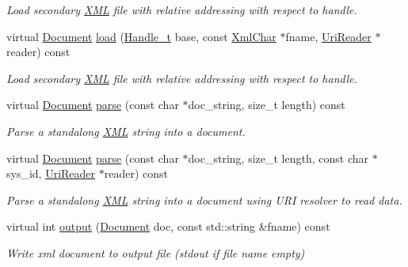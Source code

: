 \begin{DoxyCompactItemize}
\begin{DoxyCompactList}\small\item\em Load secondary \hyperlink{namespace_d_d4hep_1_1_x_m_l}{X\+ML} file with relative addressing with respect to handle. \end{DoxyCompactList}\item 
virtual \hyperlink{class_d_d4hep_1_1_x_m_l_1_1_document}{Document} \hyperlink{class_d_d4hep_1_1_x_m_l_1_1_document_handler_aa4ebc7e0ebe23c6f8db43261a0a98e7d}{load} (\hyperlink{class_d_d4hep_1_1_x_m_l_1_1_handle__t}{Handle\+\_\+t} base, const \hyperlink{namespace_d_d4hep_1_1_x_m_l_a09e5d9cc86ed782f6826dfe0778c1815}{Xml\+Char} $\ast$fname, \hyperlink{class_d_d4hep_1_1_x_m_l_1_1_uri_reader}{Uri\+Reader} $\ast$reader) const
\begin{DoxyCompactList}\small\item\em Load secondary \hyperlink{namespace_d_d4hep_1_1_x_m_l}{X\+ML} file with relative addressing with respect to handle. \end{DoxyCompactList}\item 
virtual \hyperlink{class_d_d4hep_1_1_x_m_l_1_1_document}{Document} \hyperlink{class_d_d4hep_1_1_x_m_l_1_1_document_handler_af330853c1eeef38dd17b20ad637b23ce}{parse} (const char $\ast$doc\+\_\+string, size\+\_\+t length) const
\begin{DoxyCompactList}\small\item\em Parse a standalong \hyperlink{namespace_d_d4hep_1_1_x_m_l}{X\+ML} string into a document. \end{DoxyCompactList}\item 
virtual \hyperlink{class_d_d4hep_1_1_x_m_l_1_1_document}{Document} \hyperlink{class_d_d4hep_1_1_x_m_l_1_1_document_handler_a4481bbfb8c78aaeb47d538eb07eb32d9}{parse} (const char $\ast$doc\+\_\+string, size\+\_\+t length, const char $\ast$sys\+\_\+id, \hyperlink{class_d_d4hep_1_1_x_m_l_1_1_uri_reader}{Uri\+Reader} $\ast$reader) const
\begin{DoxyCompactList}\small\item\em Parse a standalong \hyperlink{namespace_d_d4hep_1_1_x_m_l}{X\+ML} string into a document using U\+RI resolver to read data. \end{DoxyCompactList}\item 
virtual int \hyperlink{class_d_d4hep_1_1_x_m_l_1_1_document_handler_a09d1b5a74ed2515dfcdd40ec826c2eb5}{output} (\hyperlink{class_d_d4hep_1_1_x_m_l_1_1_document}{Document} doc, const std\+::string \&fname) const
\begin{DoxyCompactList}\small\item\em Write xml document to output file (stdout if file name empty) \end{DoxyCompactList}\end{DoxyCompactItemize}
